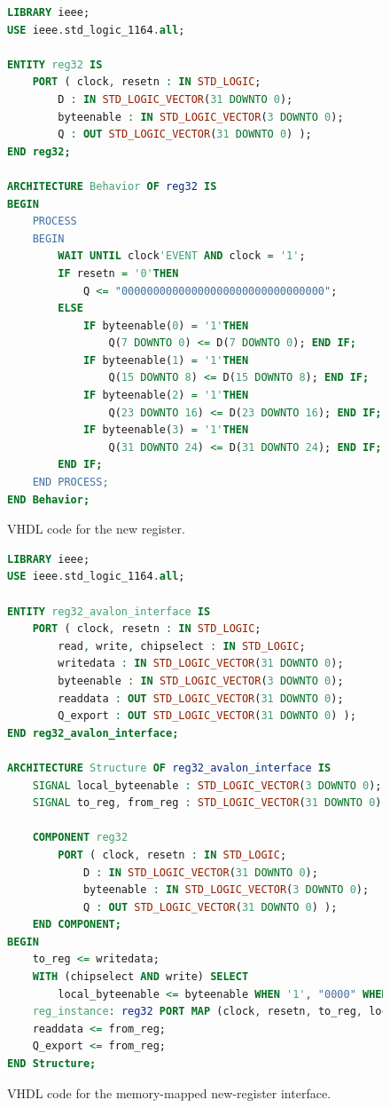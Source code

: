 \documentclass[11pt, twoside, pdftex]{article}
\begin{document}
\clearpage
\newpage
\begin{figure}[!h]
	\begin{lstlisting}[language=VHDL, xleftmargin=1.5cm]
LIBRARY ieee;
USE ieee.std_logic_1164.all;

ENTITY reg32 IS
    PORT ( clock, resetn : IN STD_LOGIC;
        D : IN STD_LOGIC_VECTOR(31 DOWNTO 0);
        byteenable : IN STD_LOGIC_VECTOR(3 DOWNTO 0);
        Q : OUT STD_LOGIC_VECTOR(31 DOWNTO 0) );
END reg32;

ARCHITECTURE Behavior OF reg32 IS
BEGIN
    PROCESS
    BEGIN
        WAIT UNTIL clock'EVENT AND clock = '1';
        IF resetn = '0'THEN
            Q <= "00000000000000000000000000000000";
        ELSE
            IF byteenable(0) = '1'THEN
                Q(7 DOWNTO 0) <= D(7 DOWNTO 0); END IF;
            IF byteenable(1) = '1'THEN
                Q(15 DOWNTO 8) <= D(15 DOWNTO 8); END IF;
            IF byteenable(2) = '1'THEN
                Q(23 DOWNTO 16) <= D(23 DOWNTO 16); END IF;
            IF byteenable(3) = '1'THEN
                Q(31 DOWNTO 24) <= D(31 DOWNTO 24); END IF;
        END IF;
    END PROCESS;
END Behavior;
		\end{lstlisting}
	\caption{VHDL code for the new register.}
	\label{fig:4}
\end{figure}

\clearpage
\newpage
\begin{figure}[!h]
	\begin{lstlisting}[language=VHDL, xleftmargin=1cm]
LIBRARY ieee;
USE ieee.std_logic_1164.all;

ENTITY reg32_avalon_interface IS
    PORT ( clock, resetn : IN STD_LOGIC;
        read, write, chipselect : IN STD_LOGIC;
        writedata : IN STD_LOGIC_VECTOR(31 DOWNTO 0);
        byteenable : IN STD_LOGIC_VECTOR(3 DOWNTO 0);
        readdata : OUT STD_LOGIC_VECTOR(31 DOWNTO 0);
        Q_export : OUT STD_LOGIC_VECTOR(31 DOWNTO 0) );
END reg32_avalon_interface;

ARCHITECTURE Structure OF reg32_avalon_interface IS
    SIGNAL local_byteenable : STD_LOGIC_VECTOR(3 DOWNTO 0);
    SIGNAL to_reg, from_reg : STD_LOGIC_VECTOR(31 DOWNTO 0);

    COMPONENT reg32
        PORT ( clock, resetn : IN STD_LOGIC;
            D : IN STD_LOGIC_VECTOR(31 DOWNTO 0);
            byteenable : IN STD_LOGIC_VECTOR(3 DOWNTO 0);
            Q : OUT STD_LOGIC_VECTOR(31 DOWNTO 0) );
    END COMPONENT;
BEGIN
    to_reg <= writedata;
    WITH (chipselect AND write) SELECT
        local_byteenable <= byteenable WHEN '1', "0000" WHEN OTHERS;
    reg_instance: reg32 PORT MAP (clock, resetn, to_reg, local_byteenable, from_reg);
    readdata <= from_reg;
    Q_export <= from_reg;
END Structure;
		\end{lstlisting}
	\caption{VHDL code for the memory-mapped new-register interface.}
	\label{fig:5}
\end{figure}
\end{document}
